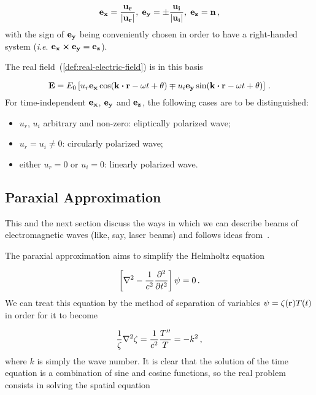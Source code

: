 \documentclass[12pt, class=report, crop=false]{standalone}
\begin{document}
\begin{equation}
  \vb{e_x} = \frac{\vb{u_r}}{\abs{\vb{u_r}}}, \; \vb{e_y} = \pm \frac{\vb{u_i}}{\abs{\vb{u_i}}}, \; \vb{e_z} = \vb{n} \,,
\end{equation}
with the sign of \(\vb{e_y}\) being conveniently chosen in order to have a right-handed system (\textit{i}.\textit{e}. \(\vb{e_x}\cp\vb{e_y} = \vb{e_z}\)).

\par
The real field~(\ref{def:real-electric-field}) is in this basis

\begin{equation}
  \vb{E} = E_0 \left[ u_r \vb{e_x} \cos(\vb{k}\vdot\vb{r}-\omega t + \theta) \mp u_i \vb{e_y} \sin(\vb{k}\vdot\vb{r}-\omega t + \theta) \right] \,.
\end{equation}
For time-independent \(\vb{e_x}\), \(\vb{e_y}\) and \(\vb{e_z}\), the following cases are to be distinguished:

\begin{itemize}
  \item \(u_r\), \(u_i\) arbitrary and non-zero: eliptically polarized wave;
  \item \(u_r=u_i\neq 0\): circularly polarized wave;
  \item either \(u_r=0\) or \(u_i=0\): linearly polarized wave.
\end{itemize}

\subsection{Paraxial Approximation}

This and the next section discuss the ways in which we can describe beams of electromagnetic waves (like, say, laser beams) and follows ideas from~\cite{goldsmithQuasiopticalSystemsGaussian1998}.

\par
The paraxial approximation aims to simplify the Helmholtz equation

\begin{equation}
  \left[\laplacian{} - \frac{1}{c^2} \pdv[2]{t} \right] \vb{\psi} = 0\,.
\end{equation}
We can treat this equation by the method of separation of variables \(\psi = \zeta (\vb{r}) T(t)\) in order for it to become

\begin{equation}
  \frac{1}{\zeta} \laplacian{\zeta} = \frac{1}{c^2} \frac{T''}{T} = - k^2 \,,
\end{equation}
where \(k\) is simply the wave number. It is clear that the solution of the time equation is a combination of sine and cosine functions, so the real problem consists in solving the spatial equation
\end{document}
